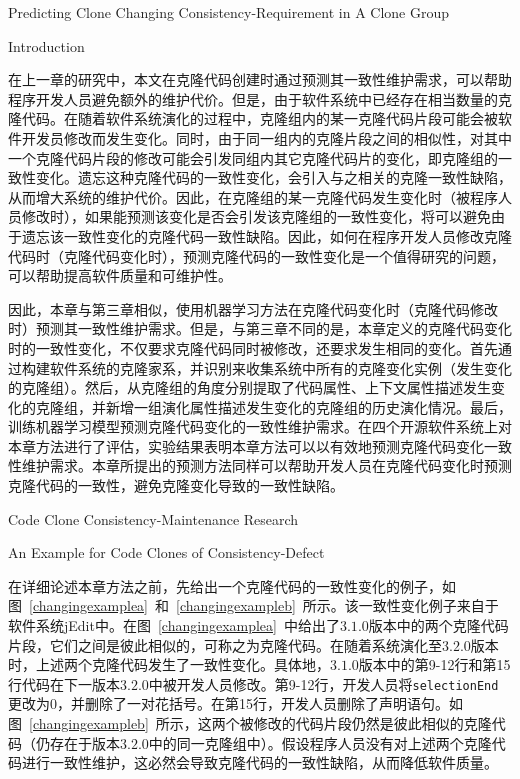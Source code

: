
{Predicting Clone Changing Consistency-Requirement in A Clone Group}

{Introduction}

在上一章的研究中，本文在克隆代码创建时通过预测其一致性维护需求，可以帮助程序开发人员避免额外的维护代价。但是，由于软件系统中已经存在相当数量的克隆代码。在随着软件系统演化的过程中，克隆组内的某一克隆代码片段可能会被软件开发员修改而发生变化。同时，由于同一组内的克隆片段之间的相似性，对其中一个克隆代码片段的修改可能会引发同组内其它克隆代码片的变化，即克隆组的一致性变化。遗忘这种克隆代码的一致性变化，会引入与之相关的克隆一致性缺陷，从而增大系统的维护代价。因此，在克隆组的某一克隆代码发生变化时（被程序人员修改时），如果能预测该变化是否会引发该克隆组的一致性变化，将可以避免由于遗忘该一致性变化的克隆代码一致性缺陷。因此，如何在程序开发人员修改克隆代码时（克隆代码变化时），预测克隆代码的一致性变化是一个值得研究的问题，可以帮助提高软件质量和可维护性。

因此，本章与第三章相似，使用机器学习方法在克隆代码变化时（克隆代码修改时）预测其一致性维护需求。但是，与第三章不同的是，本章定义的克隆代码变化时的一致性变化，不仅要求克隆代码同时被修改，还要求发生相同的变化。首先通过构建软件系统的克隆家系，并识别来收集系统中所有的克隆变化实例（发生变化的克隆组）。然后，从克隆组的角度分别提取了代码属性、上下文属性描述发生变化的克隆组，并新增一组演化属性描述发生变化的克隆组的历史演化情况。最后，训练机器学习模型预测克隆代码变化的一致性维护需求。在四个开源软件系统上对本章方法进行了评估，实验结果表明本章方法可以以有效地预测克隆代码变化一致性维护需求。本章所提出的预测方法同样可以帮助开发人员在克隆代码变化时预测克隆代码的一致性，避免克隆变化导致的一致性缺陷。

{Code Clone Consistency-Maintenance Research}

{An Example for Code Clones of Consistency-Defect}

在详细论述本章方法之前，先给出一个克隆代码的一致性变化的例子，如图~\ref{changingexamplea}~和~\ref{changingexampleb}~所示。该一致性变化例子来自于软件系统jEdit中。在图~\ref{changingexamplea}~中给出了$ 3.1.0 $版本中的两个克隆代码片段，它们之间是彼此相似的，可称之为克隆代码。在随着系统演化至$ 3.2.0 $版本时，上述两个克隆代码发生了一致性变化。具体地，$ 3.1.0 $版本中的第9-12行和第15行代码在下一版本$ 3.2.0 $中被开发人员修改。第9-12行，开发人员将{\tt selectionEnd}更改为$ 0 $，并删除了一对花括号。在第15行，开发人员删除了声明语句。如图~\ref{changingexampleb}~所示，这两个被修改的代码片段仍然是彼此相似的克隆代码（仍存在于版本$ 3.2.0 $中的同一克隆组中）。假设程序人员没有对上述两个克隆代码进行一致性维护，这必然会导致克隆代码的一致性缺陷，从而降低软件质量。

